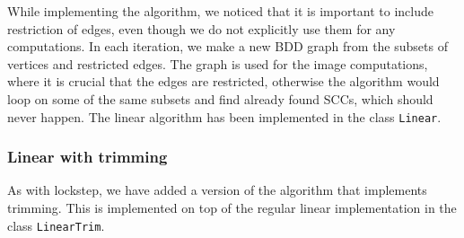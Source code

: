 \documentclass[../master/master.tex]{subfiles}
\begin{document}
While implementing the algorithm, we noticed that it is important to include restriction of edges, even though we do not explicitly use them for any computations. In each iteration, we make a new BDD graph from the subsets of vertices and restricted edges. The graph is used for the image computations, where it is crucial that the edges are restricted, otherwise the algorithm would loop on some of the same subsets and find already found SCCs, which should never happen.
The linear algorithm has been implemented in the class \texttt{Linear}. 

\subsubsection{Linear with trimming}
As with lockstep, we have added a version of the algorithm that implements trimming. This is implemented on top of the regular linear implementation in the class \texttt{LinearTrim}.
\end{document}

